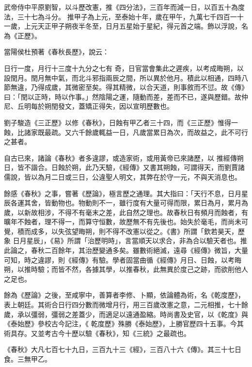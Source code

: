 \begin{pinyinscope}
 武帝侍中平原劉智，以斗歷改憲，推《四分法》，三百年而減一日，以百五十為度法，三十七為斗分。
 推甲子為上元，至泰始十年，歲在甲午，九萬七千四百一十一歲，上元天正甲子朔夜半冬至，日月五星始于星紀，得元首之端。飾以浮說，名為《正歷》。



 當陽侯杜預著《春秋長歷》，說云：



 日行一度，月行十三度十九分之七有
 奇，日官當會集此之遲疾，以考成晦朔，以設閏月。閏月無中氣，而北斗邪指兩辰之間，所以異於他月。積此以相通，四時八節無違，乃得成歲，其微密至矣。得其精微，以合天道，則事敘而不愆。故《傳》曰：「閏以正時，時以作事。」然陰陽之運，隨動而差，差而不已，遂與歷錯。故仲尼、丘明每於朔閏發文，蓋矯正得失，因以宣明歷數也。



 劉子駿造《三正歷》以修《春秋》，日蝕有甲乙者三十四，而《三正歷》惟得一蝕，比諸家既最疏。又六千餘歲輒益一日，凡歲當累日為次，而故益之，此不可行之甚者。



 自古已來，諸論《春秋》者多違謬，或造家術，或用黃帝已來諸歷，以
 推經傳朔日，皆不諧合。日蝕於朔，此乃天驗，《經傳》又書其朔蝕，可謂得天，而劉賈諸儒說，皆以為月二日或三日，公違聖人明文，其弊在於守一元，不與天消息也。



 餘感《春秋》之事，嘗著《歷論》，極言歷之通理。其大指曰：「天行不息，日月星辰各運其舍，皆動物也。物動則不一，雖行度有大量可得而限，累日為月，累月為歲，以新故相涉，不得不有毫末之差，此自然之理也。故春秋日有頻月而蝕者，有曠年不蝕者，理不得一，而算守恒數，故歷無不有先後也。始失於毫毛，而尚未可覺，積而成多，以失弦望晦朔，則不得不改憲以從之。《書》所謂「欽若昊天，歷象
 日月星辰」，《易》所謂「治歷明時」，言當順天以求合，非為合以驗天者也。推此論之，春秋二百餘年，其治歷變通多矣。雖數術絕滅，遠尋《經傳》微旨，大量可知，時之違謬，則《經傳》有驗。學者固當曲循《經傳》月日、日蝕，以考晦朔，以推時驗；而皆不然，各據其學，以推春秋，此無異於度己之跡，而欲削他人之足也。



 餘為《歷論》之後，至咸寧中，善算者李修、卜顯，依論體為術，名《乾度歷》，表上朝廷。其術合日行四分數而微增月行，用三百歲改憲之意，二元相推，七十餘歲，承以彊弱，彊弱之差蓋少，而適足以遠通盈縮。時尚書及史官，以《乾度》與《泰始歷》參校古今記注，《
 乾度歷》殊勝《泰始歷》，上勝官歷四十五事。今其術具存。又並考古今十歷以驗《春秋》，知《三統》之最疏也。



 《春秋》大凡七百七十九日，三百九十三《經》，三百八十六《傳》。其三十七日食。三無甲乙。




\end{pinyinscope}
